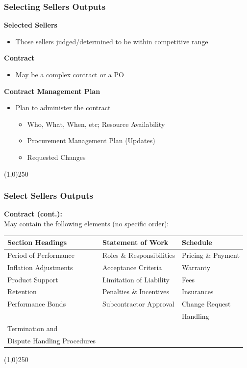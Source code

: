 \begin{frame}
\frametitle{Selecting Sellers \hfill\hfill Outputs}
\textbf{Selected Sellers}
		\begin{itemize}
			\item Those sellers judged/determined to be within competitive range
		\end{itemize}
\textbf{Contract}
		\begin{itemize}
			\item May be a complex contract or a PO
		\end{itemize}
\textbf{Contract Management Plan}
		\begin{itemize}
			\item Plan to administer the contract
			\begin{itemize}
				\item Who, What, When, etc; Resource Availability
				\item Procurement Management Plan (Updates)
				\item Requested Changes
			\end{itemize}
		\end{itemize}			
\end{frame}\begin{center}\line(1,0){250}\end{center}



\begin{frame}
\frametitle{Select Sellers \hfill\hfill Outputs}
\textbf{Contract (cont.):} \\
May contain the following elements (no specific order):
\begin{footnotesize}
\begin{table}[htb]
	\centering
		\begin{tabular}{|l|l|l|}
			\hline
			Section Headings	&	Statement of Work	&	Schedule\\
			\hline			
			Period of Performance	&	Roles \& Responsibilities	&	Pricing \& Payment\\
			\hline			
			Inflation Adjustments	&	Acceptance Criteria	&	Warranty\\
			\hline			
			Product Support	&	Limitation of Liability	&	Fees\\
			\hline
			Retention	&	Penalties \& Incentives	&	Insurances\\
			\hline
			Performance Bonds	&	Subcontractor Approval	&	Change Request\\
				&		&	Handling\\
			\hline
			Termination and 	&		&	\\
			Dispute Handling Procedures	&		&	\\
			\hline
		\end{tabular}
\end{table}
\end{footnotesize}
\end{frame}\begin{center}\line(1,0){250}\end{center}




